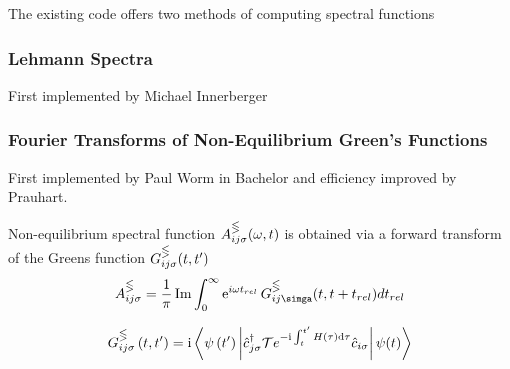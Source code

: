The existing code offers two methods of computing spectral functions \cite{spectral_function}

\subsubsection{Lehmann Spectra}
First implemented by Michael Innerberger

\subsubsection{Fourier Transforms of Non-Equilibrium Green's Functions}
First implemented by Paul Worm in Bachelor and efficiency improved by Prauhart.

Non-equilibrium spectral function $A_{ij\sigma}^\gtlt(\omega, t)$ is obtained via a forward transform of the Greens function $G_{ij\sigma}^\gtlt (t,t')$
\begin{equation}
    A_{ij\sigma}^\gtlt = \frac{1}{\pi} \operatorname{Im}\int_0^\infty \operatorname{e}^{i\omega t_{rel}} G_{ij\simga}^\gtlt (t,t+t_{rel}) dt_{rel}
\end{equation}

\begin{equation}
    G_{i j \sigma}^{\gtlt}\left(t, t^{\prime}\right)=\mathrm{i}\left\langle\psi\left(t^{\prime}\right)\left|\hat{c}_{j \sigma}^{\dagger} \mathcal{T} e^{-\mathrm{i} \int_{t}^{t^{\prime}} H(\tau) \mathrm{d} \tau} \hat{c}_{i \sigma}\right| \psi(t)\right\rangle
\end{equation}